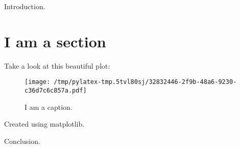 \documentclass{article}%
\begin{document}
%
\normalsize%
Introduction.%
\section{I am a section}%
\label{sec:Iamasection}%
Take a look at this beautiful plot:%


\begin{figure}[htbp]%
\centering%
\texttt{[image: /tmp/pylatex-tmp.5tvl80sj/32832446-2f9b-48a6-9230-c36d7c6c857a.pdf]}%
\caption{I am a caption.}%
\end{figure}

%
Created using matplotlib.

%
Conclusion.%
\end{document}
